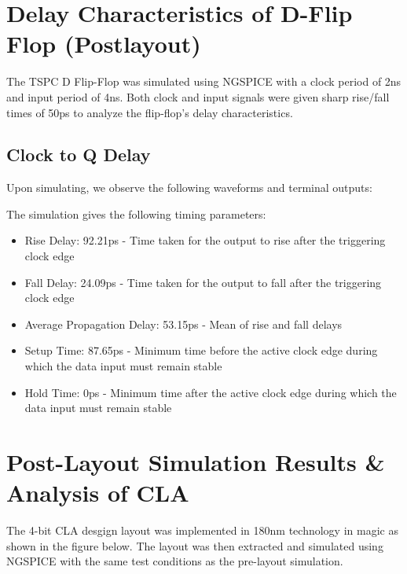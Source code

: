 \documentclass[conference]{IEEEtran}
\begin{document}
\section{Delay Characteristics of D-Flip Flop (Postlayout)}
The TSPC D Flip-Flop was simulated using NGSPICE with a clock period of 2ns and input period of 4ns. Both clock and input signals were given sharp rise/fall times of 50ps to analyze the flip-flop's delay characteristics.

\subsection{Clock to Q Delay }
Upon simulating, we observe the following waveforms and terminal outputs:



The simulation gives the following timing parameters:
\begin{itemize}
    \item Rise Delay: 92.21ps - Time taken for the output to rise after the triggering clock edge
    \item Fall Delay: 24.09ps - Time taken for the output to fall after the triggering clock edge  
    \item Average Propagation Delay: 53.15ps - Mean of rise and fall delays
    \item Setup Time: 87.65ps - Minimum time before the active clock edge during which the data input must remain stable
    \item Hold Time: 0ps - Minimum time after the active clock edge during which the data input must remain stable
\end{itemize}


\section{Post-Layout Simulation Results \& Analysis of CLA}
The 4-bit CLA desgign layout was implemented in 180nm technology in magic as shown in the figure below. The layout was then extracted and simulated using NGSPICE with the same test conditions as the pre-layout simulation.
\end{document}
